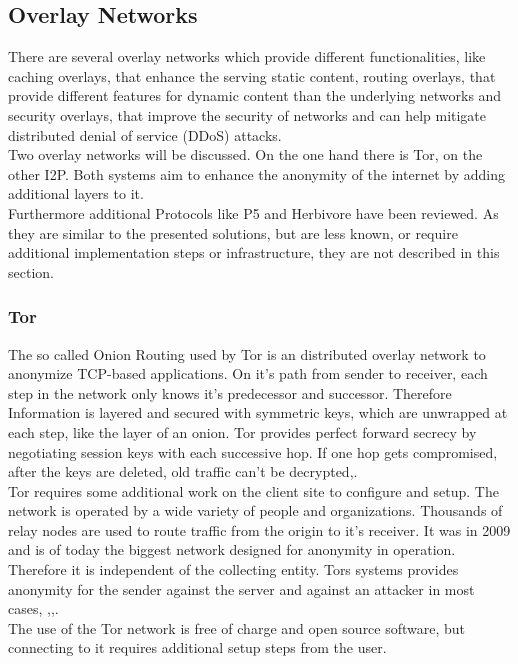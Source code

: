         
    \subsection{Overlay Networks}
        \label{subsec:related:overlay}
        There are several overlay networks which provide different functionalities, like caching overlays, that enhance the serving static content, routing overlays, that provide different features for dynamic content than the underlying networks and security overlays,  that improve the security of networks and can help mitigate distributed denial of service (DDoS) attacks\cite{pathan_overlay_2014}.\\
        Two overlay networks will be discussed. On the one hand there is Tor\cite{dingledine_tor_2004}, on the other I2P\cite{}. Both systems aim to enhance the anonymity of the internet by adding additional layers to it.\\
        Furthermore additional Protocols like P5\cite{sherwood_p_2005} and Herbivore\cite{goel_herbivore_2003} have been reviewed. As they are similar to the presented solutions, but are less known, or require additional implementation steps or infrastructure, they are not described in this section.
     
     
    \subsubsection{Tor}
        The so called Onion Routing used  by Tor is an distributed overlay network to anonymize TCP-based applications. On it's path from sender to receiver, each step in the network only knows it's predecessor and successor. Therefore Information is layered and secured with symmetric keys, which are unwrapped at each step, like the layer of an onion.
        Tor provides perfect forward secrecy by negotiating session keys with each successive hop. If one hop gets compromised, after the keys are deleted, old traffic can't be decrypted\cite{dingledine_tor_2004},\cite{borisov_shining_2008}.\\
        Tor requires some additional work on the client site to configure and setup. 
        The network is operated by a wide variety of people and organizations.
        Thousands of relay nodes are used to route traffic from the origin to it's receiver. It was in 2009 and is of today the biggest network designed for anonymity in operation\cite{edman_anonymity_2009}.
        Therefore it is independent of the collecting entity. Tors systems provides anonymity for the sender against the server and against an attacker in most cases\cite{arma_one_2009}, \cite{poulsen_feds_2013},\cite{samson_tor_2013},\cite{herrmann_website_2009}.\\
        The use of the Tor network is free of charge and open source software, but connecting to it requires additional setup steps from the user.\\
    
